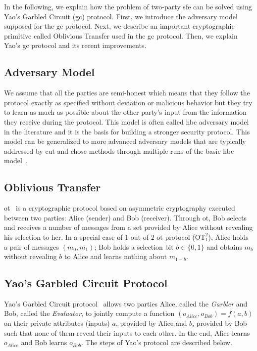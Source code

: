 In the following, we explain how the problem of two-party \acrshort{sfe} can be solved using Yao's Garbled Circuit (\acrshort{gc}) protocol.
First, we introduce the adversary model supposed for the \acrshort{gc} protocol.
Next, we describe an important cryptographic primitive called Oblivious Transfer used in the \acrshort{gc} protocol.
Then, we explain Yao's \acrshort{gc} protocol and its recent improvements.

\subsection{Adversary Model}\label{ssec:prelim-adv}
We assume that all the parties are semi-honest which means that they follow the protocol exactly as specified without deviation or malicious behavior but they try to learn as much as possible about the other party's input from the information they receive during the protocol.
This model is often called \acrfull{hbc} adversary model in the literature and it is the basis for building a stronger security protocol.
This model can be generalized to more advanced adversary models that are typically addressed by cut-and-chose methods through multiple runs of the basic \acrshort{hbc} model~\cite{lindell2007efficient, lindell2012secure, nielsen2009lego}.

\subsection{Oblivious Transfer}\label{ssec:prelim-ot}
\acrfull{ot}~\cite{naor2005computationally} is a cryptographic protocol based on asymmetric cryptography executed between two parties: Alice (sender) and Bob (receiver).
Through \acrshort{ot}, Bob selects and receives a number of messages from a set provided by Alice without revealing his selection to her.
In a special case of $1$-out-of-$2$ \acrshort{ot} protocol ($\textrm{OT}^2_1$), Alice holds a pair of messages $(m_{0}, m_{1})$; Bob holds a selection bit $b \in \{0, 1\}$ and obtains $m_{b}$ without revealing $b$ to Alice and learns nothing about $m_{1-b}$.

\subsection{Yao's Garbled Circuit Protocol}\label{ssec:prelim-gc}
Yao's Garbled Circuit protocol~\cite{yao1986generate} allows two parties Alice, called the \textit{Garbler} and Bob, called the \textit{Evaluator}, to jointly compute a function $(o_{Alice}, o_{Bob}) = f(a, b)$ on their private attributes (inputs) $a$, provided by Alice and $b$, provided by Bob such that none of them reveal their inputs to each other.
In the end, Alice learns $o_{Alice}$ and Bob learns $o_{Bob}$.
The steps of Yao's protocol are described below.

